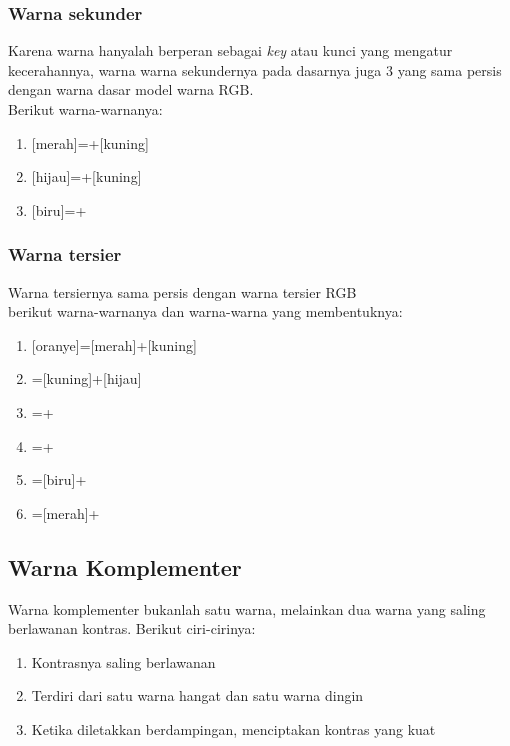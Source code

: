 \documentclass[a4paper]{article}
\newcommand{\warnalnbl}[1]{
  \tikz[baseline=-0.5\ht\strutbox]{
    \node[shape=rectangle, draw=black, fill=black, minimum height=1.5em, inner sep= 2pt, text=white]{#1}
  }
}
\begin{document}
\subsubsection{Warna sekunder}
Karena warna \warnalnbl{Hitam} hanyalah berperan sebagai \textit{key} atau kunci yang mengatur kecerahannya, warna warna sekundernya pada dasarnya juga 3 yang sama persis dengan warna dasar model warna RGB.\\ Berikut warna-warnanya:
\begin{enumerate}
  \item {}[merah]=+[kuning]
  \item {}[hijau]=+[kuning]
  \item {}[biru]=+
\end{enumerate}

\subsubsection{Warna tersier}
Warna tersiernya sama persis dengan warna tersier RGB\\
berikut warna-warnanya dan warna-warna yang membentuknya:
\begin{enumerate}
  \item {}[oranye]=[merah]+[kuning]
  \item {}=[kuning]+[hijau]
  \item {}=+
  \item {}=+
  \item {}=[biru]+
  \item {}=[merah]+
\end{enumerate}

\subsection{Warna Komplementer}
Warna komplementer bukanlah satu warna, melainkan dua warna yang saling berlawanan kontras. Berikut ciri-cirinya:
\begin{enumerate}
  \item Kontrasnya saling berlawanan
  \item Terdiri dari satu warna hangat dan satu warna dingin
  \item Ketika diletakkan berdampingan, menciptakan kontras yang kuat
\end{enumerate}
\end{document}

